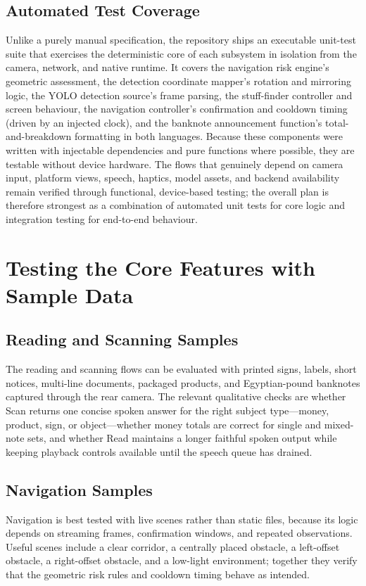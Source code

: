 \documentclass[12pt,a4paper]{report}
\begin{document}
\subsection{Automated Test Coverage}
Unlike a purely manual specification, the repository ships an executable unit-test suite that exercises the deterministic core of each subsystem in isolation from the camera, network, and native runtime. It covers the navigation risk engine's geometric assessment, the detection coordinate mapper's rotation and mirroring logic, the YOLO detection source's frame parsing, the stuff-finder controller and screen behaviour, the navigation controller's confirmation and cooldown timing (driven by an injected clock), and the banknote announcement function's total-and-breakdown formatting in both languages. Because these components were written with injectable dependencies and pure functions where possible, they are testable without device hardware. The flows that genuinely depend on camera input, platform views, speech, haptics, model assets, and backend availability remain verified through functional, device-based testing; the overall plan is therefore strongest as a combination of automated unit tests for core logic and integration testing for end-to-end behaviour.

\section{Testing the Core Features with Sample Data}
\subsection{Reading and Scanning Samples}
The reading and scanning flows can be evaluated with printed signs, labels, short notices, multi-line documents, packaged products, and Egyptian-pound banknotes captured through the rear camera. The relevant qualitative checks are whether Scan returns one concise spoken answer for the right subject type---money, product, sign, or object---whether money totals are correct for single and mixed-note sets, and whether Read maintains a longer faithful spoken output while keeping playback controls available until the speech queue has drained.

\subsection{Navigation Samples}
Navigation is best tested with live scenes rather than static files, because its logic depends on streaming frames, confirmation windows, and repeated observations. Useful scenes include a clear corridor, a centrally placed obstacle, a left-offset obstacle, a right-offset obstacle, and a low-light environment; together they verify that the geometric risk rules and cooldown timing behave as intended.
\end{document}
